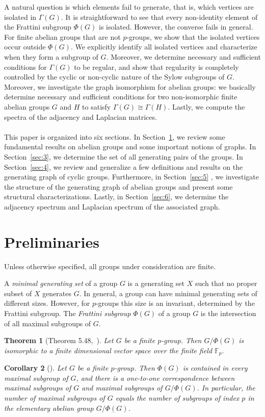 \documentclass[11pt]{article}
\newtheorem{theorem}{Theorem}[section]
\newtheorem{cor}[theorem]{Corollary}
\begin{document}
A natural question is which elements fail to generate, that is, which 
vertices are isolated in $\Gamma(G)$. It is straightforward to see 
that every non-identity element of the Frattini subgroup $\Phi(G)$ is 
isolated. However, the converse fails in general. For finite abelian groups that are not $p$-groups, we show that the isolated vertices occur outside 
$\Phi(G)$. We explicitly identify all isolated vertices and characterize when they form a subgroup of $G$. Moreover, we determine necessary and sufficient conditions for $\Gamma(G)$ to be regular, and show that regularity is completely controlled by the cyclic or non-cyclic nature 
of the Sylow subgroups of $G$.
Moreover, we investigate the graph isomorphism for abelian groups: we basically determine necessary and 
sufficient conditions for two non-isomorphic finite abelian groups $G$ and $H$ 
to satisfy $\Gamma(G) \cong \Gamma(H)$. 
Lastly, we compute the spectra of the adjacency and Laplacian matrices.
\\
\vspace{0.1cm}\\
This paper is organized into six sections. In Section~\ref{sec:2}, we review some fundamental results on abelian groups and some important notions of graphs. In Section~\ref{sec:3}, we determine the set of all generating pairs of the groups. In Section~\ref{sec:4}, we review and generalize a few definitions and results on the generating graph of cyclic groups. Furthermore, in Section~\ref{sec:5} , we investigate the structure of the generating graph of abelian groups and present some structural characterizations. Lastly, in Section~\ref{sec:6}, we determine the adjacency spectrum and Laplacian spectrum of the associated graph. 

\section{Preliminaries}\label{sec:2}
Unless otherwise specified, all groups under consideration are finite. 

A \emph{minimal generating set} of a group $G$ is a generating set $X$ 
such that no proper subset of $X$ generates $G$. In general, a group 
can have minimal generating sets of different sizes. However, for 
$p$-groups this size is an invariant, determined by the Frattini 
subgroup. The \emph{Frattini subgroup} $\Phi(G)$ of a group $G$ is the intersection of all maximal subgroups of $G$. 
\begin{theorem}[Theorem 5.48,~\cite{rotman}]
    Let $G$ be a finite $p$-group. Then $G/\Phi(G)$ is isomorphic to a finite dimensional vector space over the finite field $\mathbb{F}_p.$
\end{theorem}
\begin{cor}[\cite{rotman}]\label{cor:imp}
    Let $G$ be a finite $p$-group. Then $\Phi(G)$ is contained in every 
    maximal subgroup of $G$, and there is a one-to-one correspondence 
    between maximal subgroups of $G$ and maximal subgroups of $G/\Phi(G)$. 
    In particular, the number of maximal subgroups of $G$ equals the number 
    of subgroups of index $p$ in the elementary abelian group $G/\Phi(G)$.
    \end{cor}
    
\end{document}

